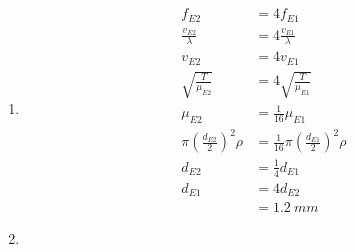 \documentclass{article}
\begin{document}
\subsection{}

\begin{enumerate}
  \item

        \begin{align*}
          f_{E2}                                     & = 4 f_{E1}                                                \\
          \frac{v_{E2}}{\lambda}                     & = 4 \frac{v_{E1}}{\lambda}                                \\
          v_{E2}                                     & = 4 v_{E1}                                                \\
          \sqrt{\frac{T}{\mu_{E2}}}                  & = 4 \sqrt{\frac{T}{\mu_{E1}}}                             \\
          \mu_{E2}                                   & = \frac{1}{16} \mu_{E1}                                   \\
          \pi \left( \frac{d_{E2}}{2} \right)^2 \rho & = \frac{1}{16} \pi \left( \frac{d_{E1}}{2} \right)^2 \rho \\
          d_{E2}                                     & = \frac{1}{4} d_{E1}                                      \\
          d_{E1}                                     & = 4 d_{E2}                                                \\
                                                     & = \qty{1.2}{mm}
        \end{align*}

  \item


\end{enumerate}
\end{document}
